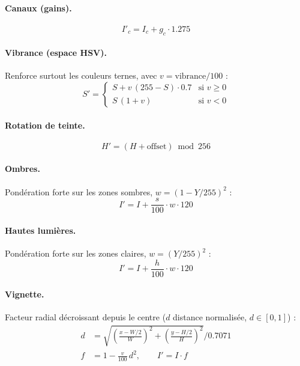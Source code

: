 \documentclass[11pt,a4paper]{article}
\begin{document}
\paragraph{Canaux (gains).}
\begin{equation}
  I'_c = I_c + g_c \cdot 1.275
  \label{eq:channels}
\end{equation}

\paragraph{Vibrance (espace HSV).}
Renforce surtout les couleurs ternes, avec $v = \text{vibrance}/100$ :
\begin{equation}
  S' = \begin{cases}
    S + v\,(255 - S)\cdot 0.7 & \text{si } v \ge 0 \\[4pt]
    S\,(1 + v) & \text{si } v < 0
  \end{cases}
  \label{eq:vibrance}
\end{equation}

\paragraph{Rotation de teinte.}
\begin{equation}
  H' = (H + \text{offset}) \bmod 256
  \label{eq:hue}
\end{equation}

\paragraph{Ombres.}
Pondération forte sur les zones sombres, $w = (1 - Y/255)^2$ :
\begin{equation}
  I' = I + \frac{s}{100}\cdot w \cdot 120
  \label{eq:shadows}
\end{equation}

\paragraph{Hautes lumières.}
Pondération forte sur les zones claires, $w = (Y/255)^2$ :
\begin{equation}
  I' = I + \frac{h}{100}\cdot w \cdot 120
  \label{eq:highlights}
\end{equation}

\paragraph{Vignette.}
Facteur radial décroissant depuis le centre ($d$ distance normalisée,
$d \in [0, 1]$) :
\begin{align}
  d &= \sqrt{\left(\frac{x - W/2}{W}\right)^2 + \left(\frac{y - H/2}{H}\right)^2}
      \bigg/ 0.7071
      \label{eq:vignette-d}\\[4pt]
  f &= 1 - \frac{v}{100}\, d^2, \qquad I' = I \cdot f
      \label{eq:vignette-f}
\end{align}
\end{document}
